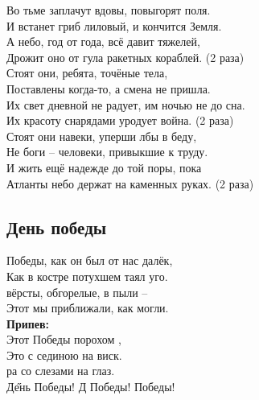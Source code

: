 \documentclass[fleqn,a5paper,12pt,twoside]{guitartabs}
\begin{document}
    Во тьме заплачут вдовы, повыгорят поля.\\
    И встанет гриб лиловый, и кончится Земля.\\
    А небо, год от года, всё давит тяжелей,\\
    Дрожит оно от гула ракетных кораблей. (2 раза)\\
    
    \-\hspace{3mm}Стоят они, ребята, точёные тела,\\
    \-\hspace{3mm}Поставлены когда-то, а смена не пришла.\\
    \-\hspace{3mm}Их свет дневной не радует, им ночью не до сна.\\
    \-\hspace{3mm}Их красоту снарядами уродует война. (2 раза)\\
    
    Стоят они навеки, уперши лбы в беду,\\
    Не боги -- человеки, привыкшие к труду.\\
    И жить ещё надежде до той поры, пока\\
    Атланты небо держат на каменных руках. (2 раза)
\newpage
{}%
\subsection*{День победы}
     Победы, как он был от нас далёк,\\
    Как в костре потухшем таял уго.\\
     вёрсты, обгорелые, в пыли --\\ 
    Этот  мы приближали, как могли.\\
    
    \-\hspace{10mm}\textbf{Припев:}\\
    \-\hspace{10mm}Этот  Победы порохом ,\\
    \-\hspace{10mm}Это  с сединою на виск.\\
    \-\hspace{10mm}ра со слезами на глаз.\\
    \-\hspace{10mm}Д\H{ень} Победы! Д Победы!  Победы!\\
\end{document}
